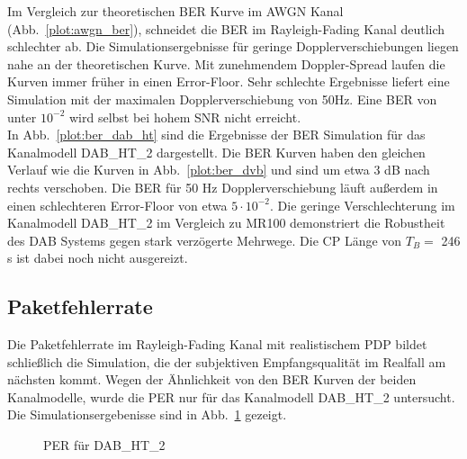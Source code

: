Im Vergleich zur theoretischen BER Kurve im AWGN Kanal (Abb.~\ref{plot:awgn_ber}), schneidet die BER im Rayleigh-Fading Kanal deutlich schlechter ab. Die Simulationsergebnisse für geringe Dopplerverschiebungen liegen nahe an der theoretischen Kurve. Mit zunehmendem Doppler-Spread laufen die Kurven immer früher in einen Error-Floor. Sehr schlechte Ergebnisse liefert eine Simulation mit der maximalen Dopplerverschiebung von 50Hz. Eine BER von unter $10^{-2}$ wird selbst bei hohem SNR nicht erreicht.
\\
In Abb.~\ref{plot:ber_dab_ht} sind die Ergebnisse der BER Simulation für das Kanalmodell DAB\_HT\_2 dargestellt. Die BER Kurven haben den gleichen Verlauf wie die Kurven in Abb.~\ref{plot:ber_dvb} und sind um etwa 3 dB nach rechts verschoben. Die BER für 50 Hz Dopplerverschiebung läuft außerdem in einen schlechteren Error-Floor von etwa $5\cdot 10^{-2}$. Die geringe Verschlechterung im Kanalmodell DAB\_HT\_2 im Vergleich zu MR100 demonstriert die Robustheit des DAB Systems gegen stark verzögerte Mehrwege. Die CP Länge von $T_B =$ 246 \textmu s ist dabei noch nicht ausgereizt.\\

\subsection{Paketfehlerrate}
Die Paketfehlerrate im Rayleigh-Fading Kanal mit realistischem PDP bildet schließlich die Simulation, die der subjektiven Empfangsqualität im Realfall am nächsten kommt. Wegen der Ähnlichkeit von den BER Kurven der beiden Kanalmodelle, wurde die PER nur für das Kanalmodell DAB\_HT\_2 untersucht. Die Simulationsergebenisse sind in Abb.~\ref{plot:doppler_per} gezeigt.

\begin{figure}[htb]
\begin{center}
\end{center}
\caption{PER für DAB\_HT\_2}
\label{plot:doppler_per}
\end{figure}

